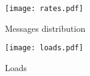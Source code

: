 \documentclass[a4paper]{article} %
\begin{document}
\begin{figure}
    \centering
    \texttt{[image: rates.pdf]}
    \caption{Messages distribution}
\end{figure}

\begin{figure}
    \centering
    \texttt{[image: loads.pdf]}
    \caption{Loads}
\end{figure}
\end{document}
